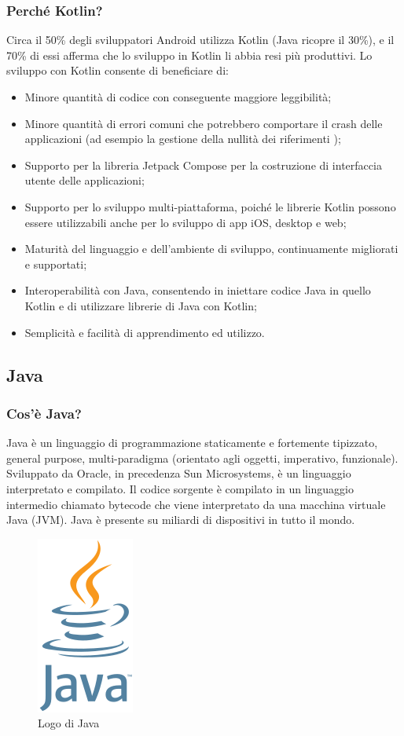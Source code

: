             \subsubsection{Perché Kotlin? \cite{JetBrains1}}
                Circa il 50\% degli sviluppatori Android utilizza Kotlin (Java ricopre il 30\%), e il 70\% di essi afferma che lo sviluppo in Kotlin li abbia resi più produttivi. Lo sviluppo con Kotlin consente di beneficiare di:
                \begin{itemize}
                    \item Minore quantità di codice con conseguente maggiore leggibilità;
                    \item Minore quantità di errori comuni che potrebbero comportare il crash delle applicazioni (ad esempio la gestione della nullità dei riferimenti \cite{JetBrains2});
                    \item Supporto per la libreria Jetpack Compose per la costruzione di interfaccia utente delle applicazioni;
                    \item Supporto per lo sviluppo multi-piattaforma, poiché le librerie Kotlin possono essere utilizzabili anche per lo sviluppo di app iOS, desktop e web;
                    \item Maturità del linguaggio e dell'ambiente di sviluppo, continuamente migliorati e supportati;
                    \item Interoperabilità con Java, consentendo in iniettare codice Java in quello Kotlin e di utilizzare librerie di Java con Kotlin;
                    \item Semplicità e facilità di apprendimento ed utilizzo.
                \end{itemize}
                
        \subsection{Java}
            \subsubsection{Cos'è Java?}
                Java è un linguaggio di programmazione staticamente e fortemente tipizzato, general purpose, multi-paradigma (orientato agli oggetti, imperativo, funzionale). Sviluppato da Oracle, in precedenza Sun Microsystems, è un linguaggio interpretato e compilato. Il codice sorgente è compilato in un linguaggio intermedio chiamato bytecode che viene interpretato da una macchina virtuale Java (JVM).  Java è presente su miliardi di dispositivi in tutto il mondo.
            \begin{figure}[htbp!]
                \centering
                \includegraphics[width=0.15\linewidth]{Immagini/System Design/Java.png}
                \caption{Logo di Java}
            \end{figure}

